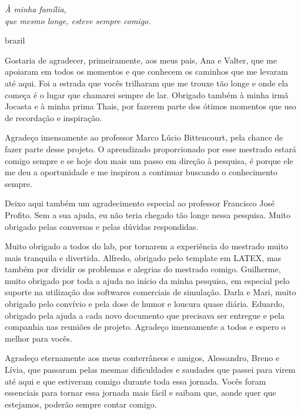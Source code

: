 

\begin{dedicatoria}
    \vspace*{\fill}
    \centering
    \noindent
    \textit{À minha família,\\
    	    que mesmo longe, esteve sempre comigo. }
    \vspace*{\fill}
\end{dedicatoria}

\begin{otherlanguage*}{brazil}
\begin{agradecimentos}

Gostaria de agradecer, primeiramente, aos meus pais, Ana e Valter, que me apoiaram em todos os momentos e que conhecem os caminhos que me levaram até aqui. Foi a estrada que vocês trilharam que me trouxe tão longe e onde ela começa é o lugar que chamarei sempre de lar. Obrigado também à minha irmã Jocasta e à minha prima Thais, por fazerem parte dos ótimos momentos que uso de recordação e inspiração. 

Agradeço imensamente ao professor Marco Lúcio Bittencourt, pela chance de fazer parte desse projeto. O aprendizado proporcionado por esse mestrado estará comigo sempre e se hoje dou mais um passo em direção à pesquisa, é porque ele me deu a oportunidade e me inspirou a continuar buscando o conhecimento sempre.

Deixo aqui também um agradecimento especial ao professor Francisco José Profito. Sem a sua ajuda, eu não teria chegado tão longe nessa pesquisa. Muito obrigado pelas conversas e pelas dúvidas respondidas.  

Muito obrigado a todos do lab, por tornarem a experiência do mestrado muito mais tranquila e divertida. Alfredo, obrigado pelo template em LATEX, mas também por dividir os problemas e alegrias do mestrado comigo. Guilherme, muito obrigado por toda a ajuda no início da minha pesquisa, em especial pelo suporte na utilização dos softwares comerciais de simulação. Darla e Mari, muito obrigado pelo convívio e pela dose de humor e loucura quase diária. Eduardo, obrigado pela ajuda a cada novo documento que precisava ser entregue e pela companhia nas reuniões de projeto. Agradeço imensamente a todos e espero o melhor para vocês.

Agradeço eternamente aos meus conterrâneos e amigos, Alessandro, Breno e Lívia, que passaram pelas mesmas dificuldades e saudades que passei para virem até aqui e que estiveram comigo durante toda essa jornada. Vocês foram essenciais para tornar essa jornada mais fácil e saibam que, aonde quer que estejamos, poderão sempre contar comigo.     


\end{agradecimentos}
\end{otherlanguage*}
